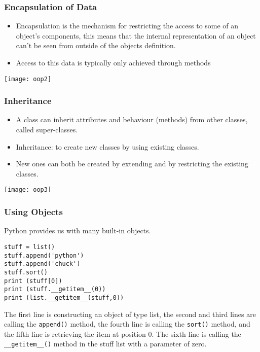 \begin{frame}[fragile]\frametitle{Encapsulation of Data}

\begin{itemize}
\item Encapsulation is the mechanism for restricting the access to some of an object's components, this means that the internal representation of an object can't be seen from outside of the objects definition. 
\item Access to this data is typically only achieved through methods
\end{itemize}

\begin{center}
\texttt{[image: oop2]}
\end{center}

\end{frame}

\begin{frame}[fragile]\frametitle{Inheritance}

\begin{itemize}
\item A class can inherit attributes and behaviour (methods) from other classes, called super-classes.
\item Inheritance: to create new classes by using existing classes. 
\item New ones can both be created by extending and by restricting the existing classes. 
\end{itemize}

\begin{center}
\texttt{[image: oop3]}
\end{center}

\end{frame}


\begin{frame}[fragile]\frametitle{Using Objects}
Python provides us with many built-in objects.
\begin{lstlisting}
stuff = list()
stuff.append('python')
stuff.append('chuck')
stuff.sort()
print (stuff[0])
print (stuff.__getitem__(0))
print (list.__getitem__(stuff,0))
\end{lstlisting}
The first line is constructing an object of type list, the second and third lines are
calling the \lstinline|append()| method, the fourth line is calling the \lstinline|sort()| method, and the
fifth line is retrieving the item at position 0.
The sixth line is calling the \lstinline|__getitem__()| method in the stuff list with a parameter of zero.
\end{frame}




